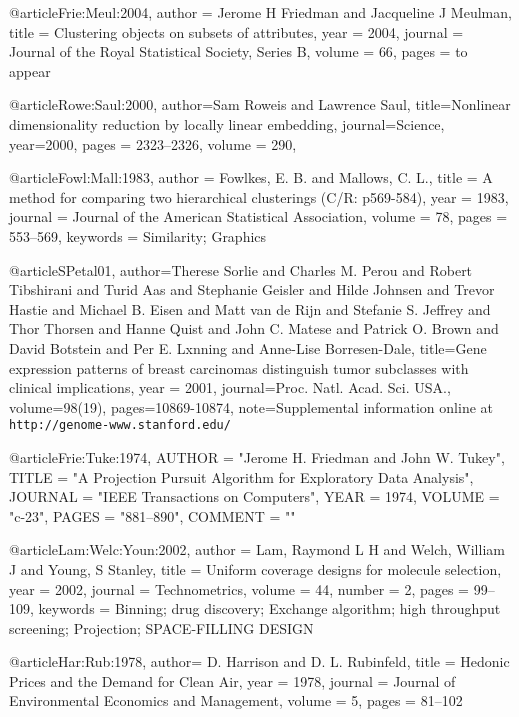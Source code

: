 @article{Frie:Meul:2004,
    author = {Jerome H Friedman and Jacqueline J Meulman},
    title = {Clustering objects on subsets of attributes},
    year = {2004},
    journal = {Journal of the Royal Statistical Society, Series B},
    volume = {66},
    pages = {to appear}
}


@article{Rowe:Saul:2000,
    author={Sam Roweis and Lawrence Saul},
    title={Nonlinear dimensionality reduction by locally linear embedding},
    journal={Science},
    year={2000},
    pages = {2323--2326},
    volume = {290},
}

@article{Fowl:Mall:1983,
    author = {Fowlkes, E. B. and Mallows, C. L.},
    title = {A method for comparing two hierarchical clusterings ({C}/{R}: p569-584)},
    year = {1983},
    journal = {Journal of the American Statistical Association},
    volume = {78},
    pages = {553--569},
    keywords = {Similarity; Graphics}
}

@article{SPetal01,
  author={Therese Sorlie and Charles M. Perou and Robert Tibshirani
and Turid Aas and Stephanie Geisler  and
Hilde Johnsen   and Trevor Hastie   and Michael B. Eisen and
Matt van de Rijn and
Stefanie S. Jeffrey and Thor Thorsen and Hanne Quist
and John C. Matese and Patrick O. Brown and
David Botstein and Per E. Lxnning and Anne-Lise Borresen-Dale},
  title={Gene expression patterns of breast carcinomas distinguish
tumor subclasses with clinical implications},
 year = 2001,
 journal={Proc. Natl. Acad. Sci. USA.},
 volume={98(19)},
 pages={10869-10874},
 note={Supplemental information online at
{\tt http://genome-www.stanford.edu/}
}}

@article{Frie:Tuke:1974,
        AUTHOR = "Jerome H. Friedman and John W. Tukey",
        TITLE = "A Projection Pursuit Algorithm for Exploratory Data Analysis",
        JOURNAL = "IEEE Transactions on Computers",
        YEAR = 1974,
        VOLUME = "c-23",
        PAGES = "881--890",
        COMMENT = ""}

@article{Lam:Welc:Youn:2002,
    author = {Lam, Raymond L H and Welch, William J and Young, S Stanley},
    title = {Uniform coverage designs for molecule selection},
    year = {2002},
    journal = {Technometrics},
    volume = {44},
    number = {2},
    pages = {99--109},
    keywords = {Binning; drug discovery; Exchange algorithm; high
throughput screening; Projection; SPACE-FILLING DESIGN}
}

@article{Har:Rub:1978,
    author= {D. Harrison and D. L. Rubinfeld},
    title =  {Hedonic Prices and the Demand for Clean Air},
    year = {1978},
    journal = {Journal of Environmental Economics and Management},
    volume = 5,
    pages = {81--102}
}

